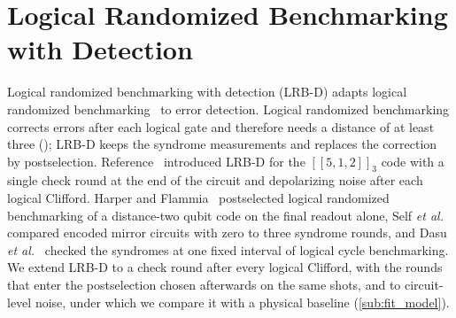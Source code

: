 \section{Logical Randomized Benchmarking with Detection}
\label{sub:lrb_d}\label{subsub:postselection}

Logical randomized benchmarking with detection (LRB-D) adapts logical randomized benchmarking~\cite{Combes2017} to error detection. Logical randomized benchmarking corrects errors after each logical gate and therefore needs a distance of at least three (); LRB-D keeps the syndrome measurements and replaces the correction by postselection. Reference~\cite{sdim} introduced LRB-D for the $[[5,1,2]]_3$ code with a single check round at the end of the circuit and depolarizing noise after each logical Clifford. Harper and Flammia~\cite{Harper2019FTIBM} postselected logical randomized benchmarking of a distance-two qubit code on the final readout alone, Self \emph{et al.}~\cite{Self2024} compared encoded mirror circuits with zero to three syndrome rounds, and Dasu \emph{et al.}~\cite{Dasu2026} checked the syndromes at one fixed interval of logical cycle benchmarking. We extend LRB-D to a check round after every logical Clifford, with the rounds that enter the postselection chosen afterwards on the same shots, and to circuit-level noise, under which we compare it with a physical baseline (\autoref{sub:fit_model}).

